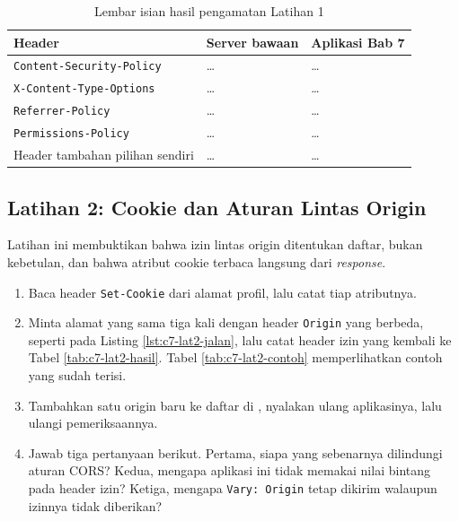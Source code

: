 \begin{table}[!htb]
  \centering
  \caption{Lembar isian hasil pengamatan Latihan 1}
  \label{tab:c7-lat1-hasil}
  \begin{tabularx}{\textwidth}{Xll}
    \hline
    \textbf{Header} & \textbf{Server bawaan} & \textbf{Aplikasi Bab 7} \\
    \hline
    \texttt{Content-Security-Policy} & \dots & \dots \\
    \hline
    \texttt{X-Content-Type-Options} & \dots & \dots \\
    \hline
    \texttt{Referrer-Policy} & \dots & \dots \\
    \hline
    \texttt{Permissions-Policy} & \dots & \dots \\
    \hline
    Header tambahan pilihan sendiri & \dots & \dots \\
    \hline
  \end{tabularx}
\end{table}

\subsection*{Latihan 2: Cookie dan Aturan Lintas Origin}

Latihan ini membuktikan bahwa izin lintas origin ditentukan daftar, bukan
kebetulan, dan bahwa atribut cookie terbaca langsung dari \textit{response}.

\begin{enumerate}
  \item Baca header \texttt{Set-Cookie} dari alamat profil, lalu catat tiap
        atributnya.
  \item Minta alamat yang sama tiga kali dengan header \texttt{Origin} yang
        berbeda, seperti pada Listing \ref{lst:c7-lat2-jalan}, lalu catat
        header izin yang kembali ke Tabel \ref{tab:c7-lat2-hasil}. Tabel
        \ref{tab:c7-lat2-contoh} memperlihatkan contoh yang sudah terisi.
  \item Tambahkan satu origin baru ke daftar di
        , nyalakan ulang
        aplikasinya, lalu ulangi pemeriksaannya.
  \item Jawab tiga pertanyaan berikut. Pertama, siapa yang sebenarnya
        dilindungi aturan CORS? Kedua, mengapa aplikasi ini tidak memakai
        nilai bintang pada header izin? Ketiga, mengapa \texttt{Vary: Origin}
        tetap dikirim walaupun izinnya tidak diberikan?
\end{enumerate}

